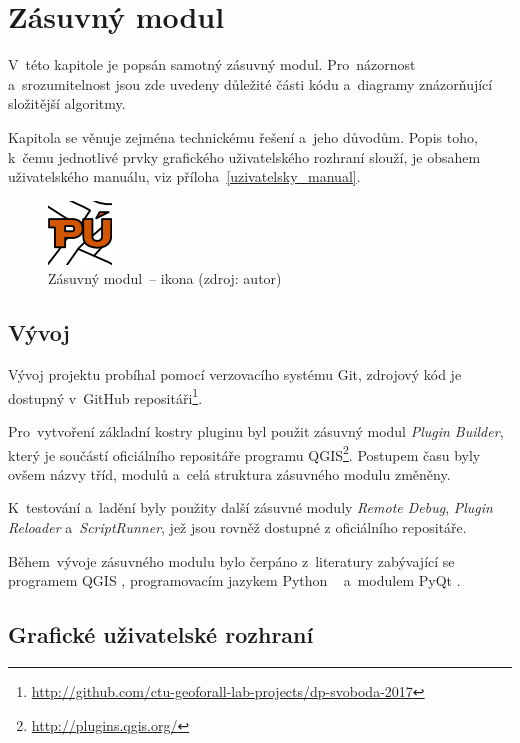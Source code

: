 \chapter{Zásuvný modul}
\label{plugin}

V~této kapitole je popsán samotný zásuvný modul. Pro~názornost
a~srozumitelnost jsou zde uvedeny důležité části kódu a~diagramy
znázorňující složitější algoritmy.

Kapitola se věnuje zejména technickému řešení a~jeho důvodům. Popis
toho, k~čemu jednotlivé prvky grafického uživatelského rozhraní
slouží, je obsahem uživatelského manuálu, viz
příloha~\ref{uzivatelsky_manual}.

	\begin{figure}[H] \centering
		\includegraphics[width=.1\textwidth]{./pictures/puplugin.png}
		\caption[Zásuvný modul~– ikona]{Zásuvný modul~– ikona (zdroj: autor)}
		\label{fig:ikona_pluginu}
 	\end{figure}

\section{Vývoj}
\label{vyvoj}

Vývoj projektu probíhal pomocí verzovacího systému
Git, zdrojový kód je dostupný
v~GitHub repositáři\footnote{\url{http://github.com/ctu-geoforall-lab-projects/dp-svoboda-2017}}.

Pro~vytvoření základní kostry pluginu byl použit zásuvný modul
\textit{Plugin Builder}, který je součástí oficiálního repositáře
programu QGIS\footnote{\label{oficialni_repositar_qgis}\url{http://plugins.qgis.org/}}. Postupem času
byly ovšem názvy tříd, modulů a~celá struktura zásuvného modulu
změněny.

K~testování a~ladění byly použity další zásuvné moduly \textit{Remote
Debug}, \textit{Plugin Reloader} a~\textit{ScriptRunner}, jež jsou rovněž
dostupné z oficiálního repositáře.

Během~vývoje zásuvného modulu bylo čerpáno z~literatury zabývající se
programem QGIS \citep{pyqgis_book}, programovacím jazykem Python
\citep{python3_oop_book}~\citep{dive_into_python} a~modulem PyQt
\citep{pyqt_book}.

\section{Grafické uživatelské rozhraní}
\label{gui}


